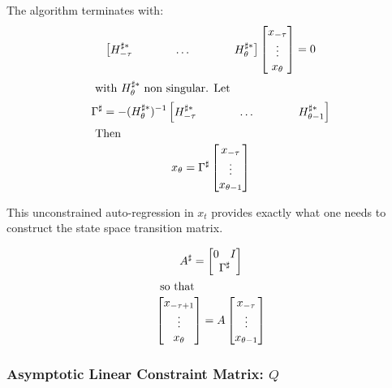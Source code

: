 \documentclass[12pt]{elsart}
\begin{document}
The algorithm terminates with:
\begin{gather}\label{eq:easy}
  \begin{bmatrix}
    \hsh
  \end{bmatrix} 
  \begin{bmatrix}
    x_{-\tau}\\ \vdots \\x_{\theta}
  \end{bmatrix} =0%
   \\ \intertext{ with $H^{\sharp\ast}_{\theta}$ non singular. Let} 
\Gamma^\sharp=-  (H^{\sharp\ast}_{\theta})^{-1}\begin{bmatrix}
    \hshShort
  \end{bmatrix} \\ \intertext{ Then }
x_{\theta} = 
 \Gamma^\sharp
  \begin{bmatrix}
    x_{-\tau}\\ \vdots \\x_{\theta-1}
  \end{bmatrix}  %
\end{gather}

This unconstrained auto-regression in $x_t$ provides exactly what one needs to
construct the state space transition matrix. 



\begin{gather}
A^\sharp= 
\begin{bmatrix}
  \begin{matrix}
    0&I
  \end{matrix}\\ \Gamma^\sharp
\end{bmatrix}\\ \intertext{ so that }
  \begin{bmatrix}
    x_{-\tau+1}\\ \vdots \\x_{\theta}
  \end{bmatrix}  = A
  \begin{bmatrix}
    x_{-\tau}\\ \vdots \\x_{\theta-1}
  \end{bmatrix} 
\end{gather}







\subsubsection{Asymptotic Linear Constraint Matrix: $Q$}
\label{asymQ}
\end{document}
